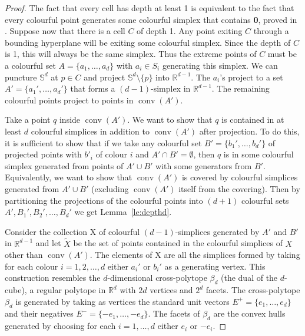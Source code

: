 \documentclass[epsbox,12pt,reqno]{amsart}
\theoremstyle{definition}
\theoremstyle{remark}
\def\conv{\operatorname{conv}}
\def\R{\mathbb{R}}
\def\X{\text{X}}
\def\Sph{\mathbb{S}}
\def\zero{{\bf 0}}
\begin{document}
\begin{proof}
The fact that every cell has depth at least 1 is equivalent to the 
fact that every colourful point generates some colourful simplex
that contains \zero, proved in \cite{Bar82}.
Suppose now that there is a cell $C$ of depth 1.
Any point exiting $C$ through a bounding hyperplane will be
exiting some colourful simplex.  Since the depth of $C$ is 1,
this will always be the same simplex.
Thus the extreme points of $C$ must be a colourful set
$A=\{a_1, \ldots, a_d\}$ with $a_i \in S_i$ generating this simplex.  
We can puncture $\Sph^d$ at $p \in C$ and project $\Sph^d \setminus \{p\}$ 
into $\R^{d-1}$.  The $a_i$'s project to a set 
$A'=\{a_1', \ldots, a_d'\}$ that forms a $(d-1)$-simplex 
in $\R^{d-1}$.  
The remaining colourful points project to points in $\conv(A')$.

Take a point $q$ inside $\conv(A')$.  
We want to show that $q$ is contained in at least $d$ 
colourful simplices in addition to $\conv(A')$ after projection.
To do this, it is sufficient to show that if we take any colourful
set $B'=\{b_1', \ldots, b_d'\}$ of projected points with $b'_i$ of
colour $i$ and $A' \cap B' = \emptyset$, then $q$ is in some colourful
simplex generated from points of $A' \cup B'$ with some generators
from $B'$.  Equivalently, we want to show that $\conv(A')$ is
covered by colourful simplices generated from $A' \cup B'$
(excluding $\conv(A')$ itself from the covering).
Then by partitioning the projections of the colourful
points into $(d+1)$ colourful sets $A', B_1', B_2', \ldots, B_d'$
we get Lemma~\ref{le:depthd}.

Consider the collection $\X$ of colourful $(d-1)$-simplices 
generated by $A'$ and $B'$ in $\R^{d-1}$ and let 
$\tilde{X}$ be the set of points 
contained in the colourful simplices of $X$ other than $\conv(A')$.
The elements of $\X$ are all the simplices
formed by taking for each colour $i=1,2,\ldots,d$ either 
$a_i'$ or $b_i'$ as a generating vertex.  
This construction resembles the $d$-dimensional 
cross-polytope $\beta_d$ (the dual of the $d$-cube), a regular polytope
in $\R^d$ with $2d$ vertices and $2^d$ facets.  
The cross-polytope $\beta_d$ is generated by taking as vertices the
standard unit vectors $E^+ = \{e_1, \ldots, e_d\}$ 
and their negatives $E^- = \{-e_1, \ldots, -e_d\}$.
The facets of $\beta_d$ are the convex hulls
generated by choosing for each $i=1,\ldots,d$ either $e_i$ or $-e_i$.


\end{proof}
\end{document}
